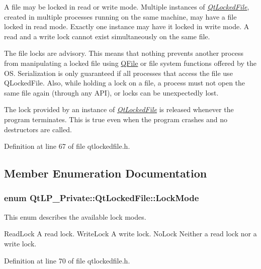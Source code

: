 A file may be locked in read or write mode. Multiple instances of {\itshape \hyperlink{class_qt_l_p___private_1_1_qt_locked_file}{Qt\+Locked\+File}}, created in multiple processes running on the same machine, may have a file locked in read mode. Exactly one instance may have it locked in write mode. A read and a write lock cannot exist simultaneously on the same file.

The file locks are advisory. This means that nothing prevents another process from manipulating a locked file using \hyperlink{class_q_file}{Q\+File} or file system functions offered by the OS. Serialization is only guaranteed if all processes that access the file use Q\+Locked\+File. Also, while holding a lock on a file, a process must not open the same file again (through any A\+PI), or locks can be unexpectedly lost.

The lock provided by an instance of {\itshape \hyperlink{class_qt_l_p___private_1_1_qt_locked_file}{Qt\+Locked\+File}} is released whenever the program terminates. This is true even when the program crashes and no destructors are called. 

Definition at line 67 of file qtlockedfile.\+h.



\subsection{Member Enumeration Documentation}
\subsubsection[{\texorpdfstring{Lock\+Mode}{LockMode}}]{\setlength{\rightskip}{0pt plus 5cm}enum {\bf Qt\+L\+P\+\_\+\+Private\+::\+Qt\+Locked\+File\+::\+Lock\+Mode}}\hypertarget{class_qt_l_p___private_1_1_qt_locked_file_ab9a54228983e33cf1fb8dace52141f26}{}\label{class_qt_l_p___private_1_1_qt_locked_file_ab9a54228983e33cf1fb8dace52141f26}
This enum describes the available lock modes.

Read\+Lock A read lock.  Write\+Lock A write lock.  No\+Lock Neither a read lock nor a write lock. 

Definition at line 70 of file qtlockedfile.\+h.



